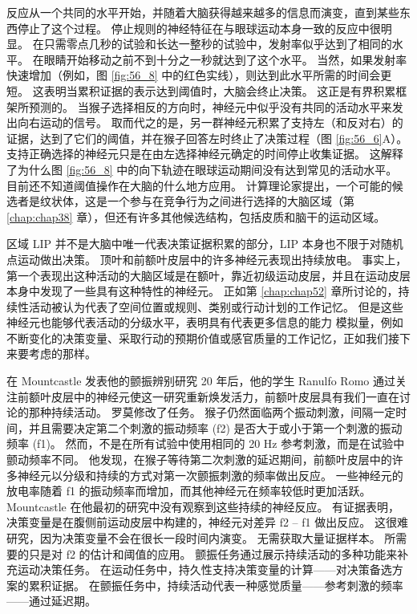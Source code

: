反应从一个共同的水平开始，并随着大脑获得越来越多的信息而演变，直到某些东西停止了这个过程。
停止规则的神经特征在与眼球运动本身一致的反应中很明显。
在只需零点几秒的试验和长达一整秒的试验中，发射率似乎达到了相同的水平。
在眼睛开始移动之前不到十分之一秒就达到了这个水平。
当然，如果发射率快速增加（例如，图 \ref{fig:56_8} 中的红色实线），则达到此水平所需的时间会更短。 这表明当累积证据的表示达到阈值时，大脑会终止决策。
这正是有界积累框架所预测的。
当猴子选择相反的方向时，神经元中似乎没有共同的活动水平来发出向右运动的信号。
取而代之的是，另一群神经元积累了支持左（和反对右）的证据，达到了它们的阈值，并在猴子回答左时终止了决策过程（图 \ref{fig:56_6}A）。
支持正确选择的神经元只是在由左选择神经元确定的时间停止收集证据。
这解释了为什么图 \ref{fig:56_8} 中的向下轨迹在眼球运动期间没有达到常见的活动水平。 目前还不知道阈值操作在大脑的什么地方应用。
计算理论家提出，一个可能的候选者是纹状体，这是一个参与在竞争行为之间进行选择的大脑区域（第 \ref{chap:chap38} 章），但还有许多其他候选结构，包括皮质和脑干的运动区域。


区域 LIP 并不是大脑中唯一代表决策证据积累的部分，LIP 本身也不限于对随机点运动做出决策。
顶叶和前额叶皮层中的许多神经元表现出持续放电。
事实上，第一个表现出这种活动的大脑区域是在额叶，靠近初级运动皮层，并且在运动皮层本身中发现了一些具有这种特性的神经元。
正如第 \ref{chap:chap52} 章所讨论的，持续性活动被认为代表了空间位置或规则、类别或行动计划的工作记忆。
但是这些神经元也能够代表活动的分级水平，表明具有代表更多信息的能力 模拟量，例如不断变化的决策变量、采取行动的预期价值或感官质量的工作记忆，正如我们接下来要考虑的那样。


在 Mountcastle 发表他的颤振辨别研究 20 年后，他的学生 Ranulfo Romo 通过关注前额叶皮层中的神经元使这一研究重新焕发活力，前额叶皮层具有我们一直在讨论的那种持续活动。
罗莫修改了任务。 猴子仍然面临两个振动刺激，间隔一定时间，并且需要决定第二个刺激的振动频率 (f2) 是否大于或小于第一个刺激的振动频率 (f1)。
然而，不是在所有试验中使用相同的 20 Hz 参考刺激，而是在试验中颤动频率不同。
他发现，在猴子等待第二次刺激的延迟期间，前额叶皮层中的许多神经元以分级和持续的方式对第一次颤振刺激的频率做出反应。
一些神经元的放电率随着 f1 的振动频率而增加，而其他神经元在频率较低时更加活跃。
Mountcastle 在他最初的研究中没有观察到这些持续的神经反应。
有证据表明，决策变量是在腹侧前运动皮层中构建的，神经元对差异 f2 – f1 做出反应。
这很难研究，因为决策变量不会在很长一段时间内演变。 无需获取大量证据样本。
所需要的只是对 f2 的估计和阈值的应用。
颤振任务通过展示持续活动的多种功能来补充运动决策任务。
在运动任务中，持久性支持决策变量的计算——对决策备选方案的累积证据。
在颤振任务中，持续活动代表一种感觉质量——参考刺激的频率——通过延迟期。



